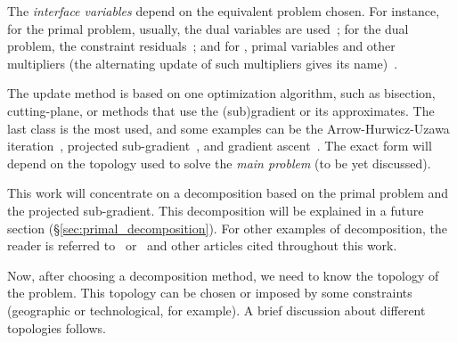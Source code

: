 \documentclass[../main.tex]{subfiles}
\begin{document}
The \emph{interface variables} depend on the equivalent problem chosen. For instance, for the primal problem, usually, the dual variables are used~\cite{Cohen1978}; for the dual problem, the constraint residuals~\cite{BoydEtAl2015}; and for \ADMM, primal variables and other multipliers (the alternating update of such multipliers gives its name)~\cite{BoydEtAl2011}.

The update method is based on one optimization algorithm, such as bisection, cutting-plane, or methods that use the (sub)gradient or its approximates. The last class is the most used, and some examples can be the Arrow-Hurwicz-Uzawa iteration~\cite{BourdaisEtAl2012}, projected sub-gradient~\cite{BiegelEtAl2012}, and gradient ascent~\cite{BoydEtAl2011}.
The exact form will depend on the topology used to solve the \emph{main problem} (to be yet discussed).

This work will concentrate on a decomposition based on the primal problem and the projected sub-gradient.
This decomposition will be explained in a future section (\S\ref{sec:primal_decomposition}).
For other examples of decomposition, the reader is referred to~\cite{MaestreEtAl2014} or~\cite{ConejoEtAl2006} and other articles cited throughout this work.

Now, after choosing a decomposition method, we need to know the topology of the problem.
This topology can be chosen or imposed by some constraints (geographic or technological, for example). A brief discussion about different topologies follows.

\end{document}
